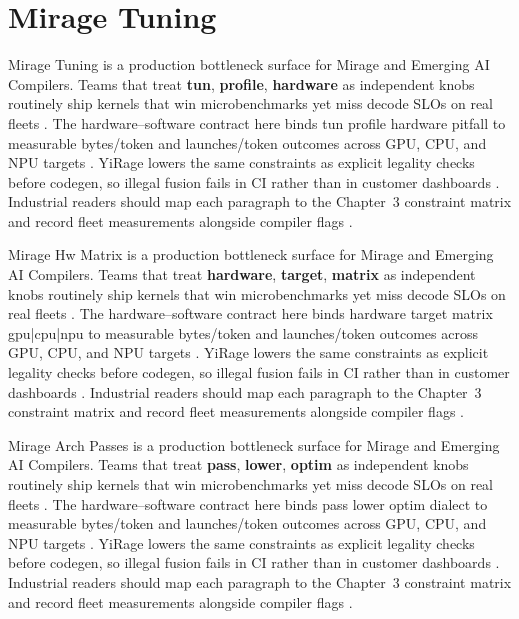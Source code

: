\section{Mirage Tuning}
\label{sec:mirage_tuning}

Mirage Tuning is a production bottleneck surface for Mirage and Emerging AI Compilers. Teams that treat \textbf{tun}, \textbf{profile}, \textbf{hardware} as independent knobs routinely ship kernels that win microbenchmarks yet miss decode SLOs on real fleets \citep{nvidia2022hopper,amd2024aie}. The hardware--software contract here binds tun profile hardware pitfall to measurable bytes/token and launches/token outcomes across GPU, CPU, and NPU targets \citep{semianalysis2024tma,dlbook}. YiRage lowers the same constraints as explicit legality checks before codegen, so illegal fusion fails in CI rather than in customer dashboards \citep{amd2024xdna,dao2022flashattention}. Industrial readers should map each paragraph to the Chapter~3 constraint matrix and record fleet measurements alongside compiler flags \citep{amd2024aie,kwon2023vllm}.

Mirage Hw Matrix is a production bottleneck surface for Mirage and Emerging AI Compilers. Teams that treat \textbf{hardware}, \textbf{target}, \textbf{matrix} as independent knobs routinely ship kernels that win microbenchmarks yet miss decode SLOs on real fleets \citep{taxbreak2026,semianalysis2024tma}. The hardware--software contract here binds hardware target matrix gpu|cpu|npu to measurable bytes/token and launches/token outcomes across GPU, CPU, and NPU targets \citep{memoryfloor2026,amd2024xdna}. YiRage lowers the same constraints as explicit legality checks before codegen, so illegal fusion fails in CI rather than in customer dashboards \citep{nvidia2022hopper,amd2024aie}. Industrial readers should map each paragraph to the Chapter~3 constraint matrix and record fleet measurements alongside compiler flags \citep{semianalysis2024tma,dlbook}.

Mirage Arch Passes is a production bottleneck surface for Mirage and Emerging AI Compilers. Teams that treat \textbf{pass}, \textbf{lower}, \textbf{optim} as independent knobs routinely ship kernels that win microbenchmarks yet miss decode SLOs on real fleets \citep{memoryfloor2026,amd2024xdna}. The hardware--software contract here binds pass lower optim dialect to measurable bytes/token and launches/token outcomes across GPU, CPU, and NPU targets \citep{nvidia2022hopper,amd2024aie}. YiRage lowers the same constraints as explicit legality checks before codegen, so illegal fusion fails in CI rather than in customer dashboards \citep{semianalysis2024tma,dlbook}. Industrial readers should map each paragraph to the Chapter~3 constraint matrix and record fleet measurements alongside compiler flags \citep{amd2024xdna,dao2022flashattention}.

